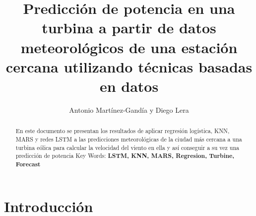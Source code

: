 \documentclass[10pt, a4paper, twocolumn]{article}
\title{Predicción de potencia en una turbina a partir de datos meteorológicos de una estación cercana utilizando técnicas basadas en datos}
\author{Antonio Martínez-Gandía y Diego Lera}
\begin{document}
\maketitle


\begin{abstract}
\begin{flushleft}
En este documento se presentan los resultados de aplicar regresión logística, KNN, MARS y redes LSTM a las predicciones meteorológicas de la ciudad más cercana a una turbina eólica para calcular la velocidad del viento en ella y así conseguir a su vez una predicción de potencia
Key Words: \textbf{LSTM, KNN, MARS, Regresion, Turbine, Forecast}
\end{flushleft}
\end{abstract}


\section*{Introducción}
\end{document}
